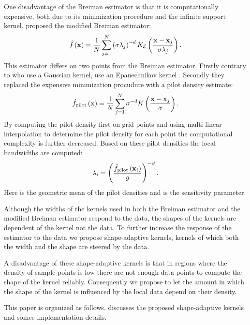 One disadvantage of the Breiman estimator is that it is computationally expensive, both due to its minimization procedure and the infinite support kernel. \citeauthor{wilkinson1995dataplot} proposed the modified Breiman estimator:
%
	\begin{equation}\label{eq:1:bme}
		\varEstimatedDensityFunction{\varPattern} = \frac{1}{\varNumPatterns} \sum_{j = 1}^{\varNumPatterns} \left(\varBandwidth \varLocalBandwidth{j} \right)^{- \varDim} \varKernel[\varEpan]{\frac{\varPattern - \varPattern[j]}{\varBandwidth \varLocalBandwidth{j}}}.
	\end{equation}
%
This estimator differs on two points from the Breiman estimator. Firstly contrary to \citeauthor{breiman1977variable} who use a Gaussian kernel, \citeauthor{ferdosi2011comparison} use an Epanechnikov kernel \cite{epanechnikov1969non}. Secondly they replaced the expensive minimization procudure with a pilot density estimate:
% 
	\begin{equation}\label{eq:1:mbePilot}
		\varPilotDensityFunction{\varPattern} = \frac{1}{\varNumPatterns} \sum_{j = 1}^{\varNumPatterns} \varBandwidth^{- \varDim} \varKernel{\frac{\varPattern - \varPattern[j]}{\varBandwidth}}.
	\end{equation}
%
By computing the pilot density first on grid points and using multi-linear interpolation to determine the pilot density for each point the computational complexity is further decreased. 
Based on these pilot densities the local bandwidths are computed:
	\begin{equation}\label{eq:1:mbeLocalBandwidth}
		\varLocalBandwidth{i} = \left( \frac{\varPilotDensityFunction{\varPattern[i]}}{\varGeometricMean}
		\right)^{-\varMBESensitivityParam}.
	\end{equation}
Here \varGeometricMean is the geometric mean of the pilot densities and \varMBESensitivityParam is the sensitivity parameter. 

Although the widths of the kernels used in both the Breiman estimator and the modified Breiman estimator respond to the data, the shapes of the kernels are dependent of the kernel not the data. To further increase the response of the estimator to the data we propose shape-adaptive kernels, kernels of which both the width and the shape are steered by the data. 

A disadvantage of these shape-adaptive kernels is that in regions where the density of sample points is low there are not enough data points to compute the shape of the kernel reliably. Consequently we propose to let the amount in which the shape of the kernel is influenced by the local data depend on their density. 

This paper is organized as follows.  discusses the proposed shape-adaptive kernels and somee implementation details. 